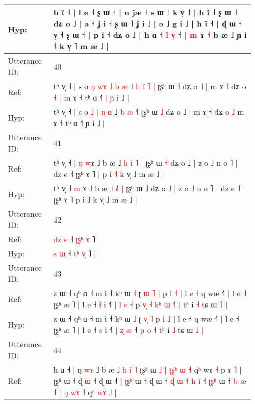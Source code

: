 \documentclass[10pt]{article}
\DeclareRobustCommand{\hl}[1]{{\textcolor{red}{#1}}}
\begin{document}
\begin{longtable}{ll}
 \\
Hyp: & h ĩ ˧ | l e ˧ ʂ ɯ\hl{}\hl{}\hl{}\hl{}\hl{}\hl{}\hl{} ˧ | n jæ ˧ s ɯ ˩ k v̩ ˩ | h ĩ ˧ ʂ ɯ ˧ dʑ o ˩ | ə ˧ ʝ i ˧ ʂ ɯ ˥ ʝ i ˩ | ə ˩ g i ˩ | h ĩ ˧ | ɖ ɯ ˧ v̩ ˧ ʂ ɯ ˧ | p i ˧ dʑ o ˩ | h ɑ ˧ \hl{l} \hl{v}\hl{̩} ˧ | \hl{m} \hl{}ɤ \hl{˧} b æ ˩ ɲ i \hl{˧} k v̩ ˥\hl{}\hl{} m æ ˩ |
 \\
\midrule
Utterance ID: & 40 \\
Ref: & tʰ v̩ ˧ | s o\hl{ }\hl{ŋ} \hl{w}\hl{ɤ} \hl{˩} \hl{b} \hl{æ} ˩ \hl{h} \hl{i}\hl{̃} \hl{˥}\hl{ }\hl{|} ʈʂʰ ɯ \hl{˧} dʑ o ˩ | m ɤ ˧ dʑ o\hl{ }\hl{˧} \hl{|} m ɤ ˧ tʰ ɑ ˧˥\hl{ }\hl{|} ɲ i ˩ |
 \\
Hyp: & tʰ v̩ ˧ | s o\hl{}\hl{} \hl{}\hl{˩} \hl{|} \hl{ŋ} \hl{ɑ} ˩ \hl{b} \hl{}\hl{æ} \hl{}\hl{˧}\hl{˥} ʈʂʰ ɯ \hl{˩} dʑ o ˩ | m ɤ ˧ dʑ o\hl{}\hl{} \hl{˩} m ɤ ˧ tʰ ɑ ˧˥\hl{}\hl{} ɲ i ˩ |
 \\
\midrule
Utterance ID: & 41 \\
Ref: & tʰ v̩ ˧\hl{ }\hl{|} \hl{ŋ} \hl{w}ɤ ˩ b æ ˩\hl{ }\hl{h} \hl{i}\hl{̃}\hl{ }˥ | ʈʂʰ ɯ \hl{˧} dʑ o ˩ | z o ˩ n o ˥ | dz e ˧ ʈʂʰ ɤ ˥\hl{ }\hl{|} p i \hl{˧} k v̩ ˩ m æ ˩ |
 \\
Hyp: & tʰ v̩ ˧\hl{}\hl{} \hl{m} \hl{}ɤ ˩ b æ ˩\hl{}\hl{} \hl{}\hl{}\hl{˩}˥ | ʈʂʰ ɯ \hl{˩} dʑ o ˩ | z o ˩ n o ˥ | dz e ˧ ʈʂʰ ɤ ˥\hl{}\hl{} p i \hl{˩} k v̩ ˩ m æ ˩ |
 \\
\midrule
Utterance ID: & 42 \\
Ref: & \hl{d}\hl{z} \hl{e} ˧ \hl{ʈ}\hl{ʂ}ʰ \hl{}\hl{ɤ} ˥\hl{}\hl{}
 \\
Hyp: & \hl{}\hl{s} \hl{ɯ} ˧ \hl{}\hl{t}ʰ \hl{v}\hl{̩} ˥\hl{ }\hl{|}
 \\
\midrule
Utterance ID: & 43 \\
Ref: & z ɯ ˧ qʰ ɑ ˧ m i ˧ kʰ ɯ \hl{˧} ʈ \hl{ɯ}\hl{ }\hl{˥} \hl{|} p i \hl{˧} | l e ˧ q wæ ˧˥ | l e ˧ ʈʂʰ æ ˥ | l e ˧ \hl{ɬ} i ˧˥ | \hl{l} \hl{e} ˧ p\hl{ }\hl{v}\hl{̩}\hl{ }\hl{˧}\hl{ }\hl{k}\hl{ʰ} \hl{ɯ} ˧\hl{˥}\hl{ }\hl{|} tʰ i \hl{˧} tɕ ɯ \hl{˥} |
 \\
Hyp: & z ɯ ˧ qʰ ɑ ˧ m i ˧ kʰ ɯ \hl{˩} ʈ \hl{}\hl{v}\hl{̩} \hl{˥} p i \hl{˩} | l e ˧ q wæ ˧˥ | l e ˧ ʈʂʰ æ ˥ | l e ˧ \hl{s} i ˧˥ | \hl{ʐ} \hl{æ} ˧ p\hl{}\hl{}\hl{}\hl{}\hl{}\hl{}\hl{}\hl{} \hl{o} ˧\hl{}\hl{}\hl{} tʰ i \hl{˩} tɕ ɯ \hl{˩} |
 \\
\midrule
Utterance ID: & 44 \\
Ref: & h ɑ ˧ | ŋ \hl{w}\hl{ɤ} ˩ b æ ˩\hl{ }\hl{h} \hl{i}\hl{̃} \hl{˥} ʈʂʰ ɯ \hl{˩} |\hl{ }\hl{ʈ}\hl{ʂ}\hl{ʰ}\hl{ }\hl{ɯ}\hl{ }\hl{˧} qʰ wɤ \hl{˧} p ɤ \hl{˥} | ʈʂʰ ɯ ˧\hl{}\hl{} ɖ \hl{}\hl{ɯ} ˧ ɖ ɯ ˧\hl{ }\hl{|} \hl{ʈ}ʂ\hl{ʰ} ɯ ˧ ɖ ɯ ˧\hl{ }\hl{ɖ}\hl{ }\hl{ɯ} \hl{˧} \hl{h} \hl{i}\hl{̃} ˧ \hl{ʈ}\hl{ʂ}\hl{ʰ} ɯ ˧ \hl{}\hl{b} æ ˧\hl{ }\hl{|} ŋ \hl{w}\hl{ɤ} \hl{˧} qʰ \hl{w}\hl{ɤ} ˩ |

\end{longtable}
\end{document}
